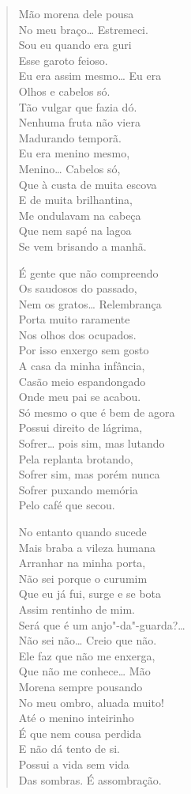 \begin{verse}
Mão morena dele pousa\\
No meu braço\ldots{} Estremeci.\\
Sou eu quando era guri\\
Esse garoto feioso.\\
Eu era assim mesmo\ldots{} Eu era\\
Olhos e cabelos só.\\
Tão vulgar que fazia dó.\\
Nenhuma fruta não viera\\
Madurando temporã.\\
Eu era menino mesmo,\\
Menino\ldots{} Cabelos só,\\
Que à custa de muita escova\\
E de muita brilhantina,\\
Me ondulavam na cabeça\\
Que nem sapé na lagoa\\
Se vem brisando a manhã.

É gente que não compreendo\\
Os saudosos do passado,\\
Nem os gratos\ldots{} Relembrança\\
Porta muito raramente\\
Nos olhos dos ocupados.\\
Por isso enxergo sem gosto\\
A casa da minha infância,\\
Casão meio espandongado\\
Onde meu pai se acabou.\\
Só mesmo o que é bem de agora\\
Possui direito de lágrima,\\
Sofrer\ldots{} pois sim, mas lutando\\
Pela replanta brotando,\\
Sofrer sim, mas porém nunca\\
Sofrer puxando memória\\
Pelo café que secou.

No entanto quando sucede\\
Mais braba a vileza humana\\
Arranhar na minha porta,\\
Não sei porque o curumim\\
Que eu já fui, surge e se bota\\
Assim rentinho de mim.\\
Será que é um anjo"-da"-guarda?\ldots{}\\
Não sei não\ldots{} Creio que não.\\
Ele faz que não me enxerga,\\
Que não me conhece\ldots{} Mão\\
Morena sempre pousando\\
No meu ombro, aluada muito!\\
Até o menino inteirinho\\
É que nem cousa perdida\\
E não dá tento de si.\\
Possui a vida sem vida\\
Das sombras. É assombração.


\end{verse}
